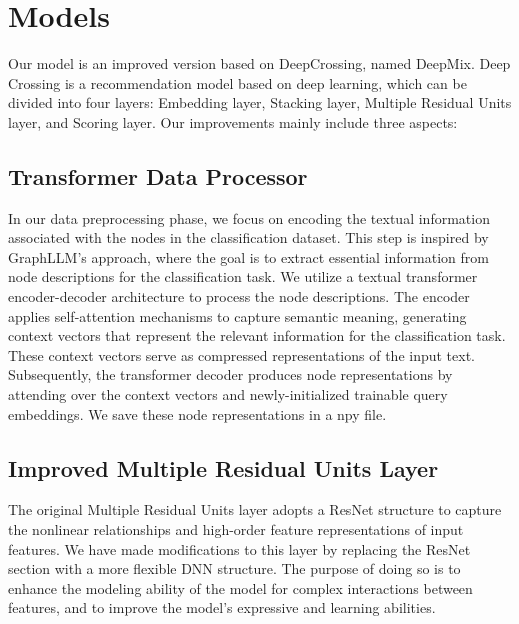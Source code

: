 \documentclass{sigkddExp}
\begin{document}
\section{Models}
\vspace{3mm}
Our model is an improved version based on DeepCrossing, named DeepMix. Deep Crossing is a recommendation model based on deep learning, which can be divided into four layers: Embedding layer, Stacking layer, Multiple Residual Units layer, and Scoring layer. Our improvements mainly include three aspects:

\subsection{Transformer Data Processor}
\vspace{3mm}
In our data preprocessing phase, we focus on encoding the textual information associated with the nodes in the classification dataset. This step is inspired by GraphLLM's approach, where the goal is to extract essential information from node descriptions for the classification task.
\vspace{3mm}\newline
We utilize a textual transformer encoder-decoder architecture to process the node descriptions. The encoder applies self-attention mechanisms to capture semantic meaning, generating context vectors that represent the relevant information for the classification task. These context vectors serve as compressed representations of the input text.
\vspace{3mm}\newline
Subsequently, the transformer decoder produces node representations by attending over the context vectors and newly-initialized trainable query embeddings. We save these node representations in a npy file.

\subsection{Improved Multiple Residual Units Layer}
\vspace{3mm}
The original Multiple Residual Units layer adopts a ResNet structure to capture the nonlinear relationships and high-order feature representations of input features. We have made modifications to this layer by replacing the ResNet section with a more flexible DNN structure. The purpose of doing so is to enhance the modeling ability of the model for complex interactions between features, and to improve the model's expressive and learning abilities.
\end{document}
